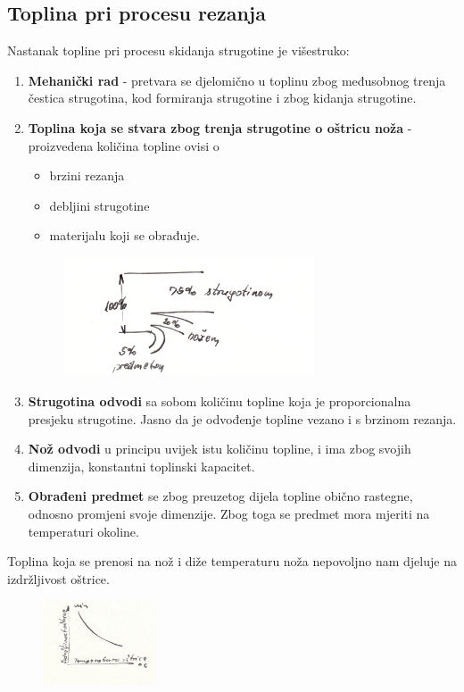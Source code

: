 \documentclass[a4paper,12pt]{article}
\numberwithin{figure}{section}
\begin{document}
\subsection{Toplina pri procesu rezanja}
Nastanak topline pri procesu skidanja strugotine je višestruko:
\begin{enumerate}
\item \textbf{Mehanički rad} - pretvara se djelomično u toplinu zbog međusobnog trenja čestica strugotina, kod formiranja strugotine i zbog kidanja strugotine.
\item \textbf{Toplina koja se stvara zbog trenja strugotine o oštricu noža} - proizvedena količina topline ovisi o 
\begin{itemize}
\item brzini rezanja
\item debljini strugotine
\item materijalu koji se obrađuje.
\end{itemize}
\begin{figure}[!h]
\includegraphics[width=0.7\textwidth]{image_11-1.png}
\end{figure}
\FloatBarrier
\item \textbf{Strugotina odvodi} sa sobom količinu topline koja je proporcionalna presjeku strugotine. Jasno da je odvođenje topline vezano i s brzinom rezanja.
\item \textbf{Nož odvodi} u principu uvijek istu količinu topline, i ima zbog svojih dimenzija, konstantni toplinski kapacitet.
\item \textbf{Obrađeni predmet} se zbog preuzetog dijela topline obično rastegne, odnosno promjeni svoje dimenzije. Zbog toga se predmet mora mjeriti na temperaturi okoline.
\end{enumerate}
Toplina koja se prenosi na nož i diže temperaturu noža nepovoljno nam djeluje na izdržljivost oštrice.
\begin{figure}
\vspace{-0.5cm}
  \begin{center}
    \includegraphics[width=0.3\textwidth]{image_11-2.png}
  \end{center}
  \vspace{-1cm}
\end{figure}
\end{document}
